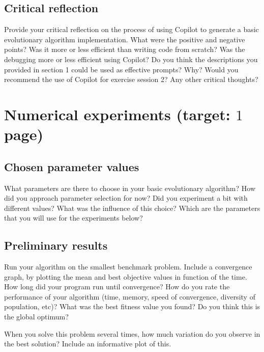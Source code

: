 \documentclass[a4paper,10pt]{article}
\newcommand{\ReplaceMe}[1]{{\color{blue}#1}}
\begin{document}
\subsection{Critical reflection}
\ReplaceMe{Provide your critical reflection on the process of using Copilot to generate a basic evolutionary algorithm implementation. What were the positive and negative points? Was it more or less efficient than writing code from scratch? Was the debugging more or less efficient using Copilot? Do you think the descriptions you provided in section 1 could be used as effective prompts? Why? Would you recommend the use of Copilot for exercise session 2? Any other critical thoughts?}


\section{Numerical experiments \hfill(target: $1$ page)}

\subsection{Chosen parameter values}

\ReplaceMe{What parameters are there to choose in your basic evolutionary algorithm? How did you approach parameter selection for now? Did you experiment a bit with different values? What was the influence of this choice? Which are the parameters that you will use for the experiments below?}

\subsection{Preliminary results}

\ReplaceMe{Run your algorithm on the smallest benchmark problem. Include a convergence graph, by plotting the mean and best objective values in function of the time. How long did your program run until convergence? How do you rate the performance of your algorithm (time, memory, speed of convergence, diversity of population, etc)? What was the best fitness value you found? Do you think this is the global optimum? 

When you solve this problem several times, how much variation do you observe in the best solution? Include an informative plot of this.}
\end{document}
